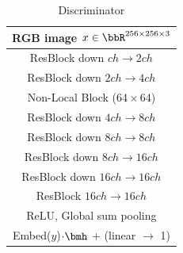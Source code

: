 \begin{table}[ht]
\begin{subtable}{.4\textwidth}
{\begin{tabular}{c}
                  RGB image $x\in \bbR^{256 \times 256 \times 3}$ \\
                  \midrule
                  ResBlock down $ch \rightarrow 2ch$\\
                  \midrule
                  ResBlock down $2ch \rightarrow 4ch$\\
                  \midrule
                  Non-Local Block ($64\times 64$) \\
                  \midrule
                  ResBlock down $4ch \rightarrow 8ch$\\
                  \midrule
                  ResBlock down $8ch \rightarrow 8ch$\\
                  \midrule
                  ResBlock down $8ch \rightarrow 16ch$\\
                  \midrule
                  ResBlock down $16ch \rightarrow 16ch$\\
                  \midrule
                  ResBlock $16ch \rightarrow 16ch$\\
                  \midrule
                  ReLU, Global sum pooling\\
                  \midrule
                  Embed($y$)$\cdot \bmh$ + (linear $\rightarrow$ 1) \\
                  \midrule
                  \bottomrule
              \end{tabular}}
              \caption{\label{tab:dis_resnet_imagenet_256} Discriminator}
          \end{subtable}
\end{table}

